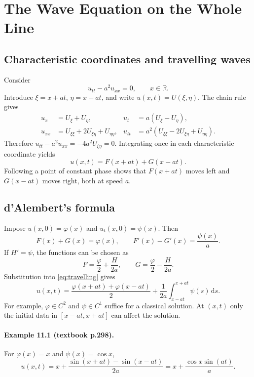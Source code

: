 \documentclass[11pt,a4paper]{article}
\newcommand{\dd}{\,\mathrm{d}}
\newcommand{\R}{\mathbb{R}}
\newif\ifteachernotes\teachernotesfalse %
\newcommand{\teachernote}[1]{\ifteachernotes\par\smallskip
  \noindent\textit{Instructor note.} #1\par\smallskip\fi}
\begin{document}
\section{The Wave Equation on the Whole Line}
\subsection{Characteristic coordinates and travelling waves}
Consider
\begin{equation}
 u_{tt}-a^2u_{xx}=0,\qquad x\in\R.
\end{equation}
Introduce $\xi=x+at$, $\eta=x-at$, and write $u(x,t)=U(\xi,\eta)$.
The chain rule gives
\begin{align}
 u_x&=U_\xi+U_\eta,&u_t&=a(U_\xi-U_\eta),\\
 u_{xx}&=U_{\xi\xi}+2U_{\xi\eta}+U_{\eta\eta},&
 u_{tt}&=a^2(U_{\xi\xi}-2U_{\xi\eta}+U_{\eta\eta}).
\end{align}
Therefore $u_{tt}-a^2u_{xx}=-4a^2U_{\xi\eta}=0$.
Integrating once in each characteristic coordinate yields
\begin{equation}\label{eq:travelling}
 \boxed{u(x,t)=F(x+at)+G(x-at).}
\end{equation}
Following a point of constant phase shows that $F(x+at)$ moves left and
$G(x-at)$ moves right, both at speed $a$.

\subsection{d'Alembert's formula}
Impose $u(x,0)=\varphi(x)$ and $u_t(x,0)=\psi(x)$. Then
\begin{equation}
 F(x)+G(x)=\varphi(x),\qquad F'(x)-G'(x)=\frac{\psi(x)}a.
\end{equation}
If $H'=\psi$, the functions can be chosen as
\begin{equation}
 F=\frac{\varphi}{2}+\frac{H}{2a},\qquad
 G=\frac{\varphi}{2}-\frac{H}{2a}.
\end{equation}
Substitution into \eqref{eq:travelling} gives
\begin{equation}\label{eq:dalembert}
 \boxed{u(x,t)=\frac{\varphi(x+at)+\varphi(x-at)}2
           +\frac1{2a}\int_{x-at}^{x+at}\psi(s)\dd s.}
\end{equation}
For example, $\varphi\in C^2$ and $\psi\in C^1$ suffice for a classical solution.
At $(x,t)$ only the initial data in $[x-at,x+at]$ can affect the solution.

\paragraph{Example 11.1 (textbook p.298).}
For $\varphi(x)=x$ and $\psi(x)=\cos x$,
\begin{equation}
 u(x,t)=x+\frac{\sin(x+at)-\sin(x-at)}{2a}
       =x+\frac{\cos x\sin(at)}a.
\end{equation}
\teachernote{This is the mathematical example retained from the notes. Applying it
 literally to the preceding small-slope string model requires appropriate amplitude
 and length scales. The formula itself does not require finite total energy.}
\end{document}

